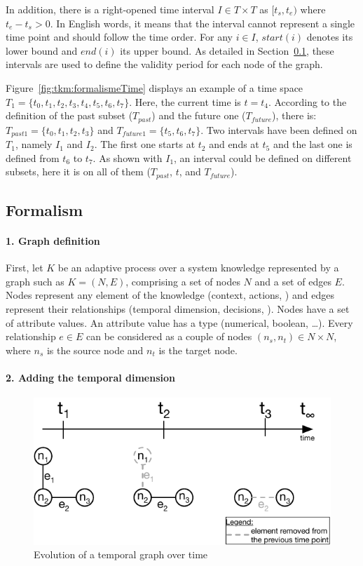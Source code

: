 In addition, there is a right-opened time interval $I \in T \times T$ as $[t_s, t_e)$ where $t_e - t_s > 0$.
In English words, it means that the interval cannot represent a single time point and should follow the time order. 
For any $i \in I$, $start(i)$ denotes its lower bound and $end(i)$ its upper bound.
As detailed in Section~\ref{sec:tkm:formalism}, these intervals are used to define the validity period for each node of the graph. 

Figure~\ref{fig:tkm:formalismeTime} displays an example of a time space $T_1 = \{t_0, t_1, t_2, t_3, t_4, t_5, t_6, t_7\}$.
Here, the current time is $t = t_4$.
According to the definition of the past subset ($T_{past}$) and the future one ($T_{future}$), there is: $T_{past1} =  \{t_0, t_1, t_2, t_3\}$ and $T_{future1} = \{t_5, t_6, t_7\}$.
Two intervals have been defined on $T_1$, namely $I_1$ and $I_2$.
The first one starts at $t_2$ and ends at $t_5$ and the last one is defined from $t_6$ to $t_7$.
As shown with $I_1$, an interval could be defined on different subsets, here it is on all of them ($T_{past}$, $t$, and $T_{future}$).

\subsection{Formalism}
\label{sec:tkm:formalism}
 
 \paragraph{1. Graph definition}
First, let $K$ be an adaptive process over a system \gls{knowledge} represented by a graph such as $K = (N, E)$, comprising a set of nodes $N$ and a set of edges $E$.
Nodes represent any element of the knowledge (context, actions, \etc) and edges represent their relationships (temporal dimension, decisions, \etc).
Nodes have a set of attribute values.
An attribute value has a type (numerical, boolean, \ldots). 
Every relationship $e \in E$ can be considered as a couple of nodes $(n_s, n_t) \in N \times N$, where $n_s$ is the source node and $n_t$ is the target node.

\paragraph{2. Adding the temporal dimension}

\begin{figure}
   \centering
	\includegraphics{img/chapt-tkm/validityExample}
	\caption{Evolution of a temporal graph over time}
	\label{fig:tkm:validityEx}
\end{figure}

